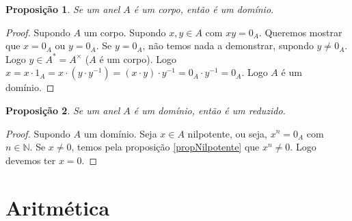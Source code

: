 \documentclass{article}
\theoremstyle{plain}
\newtheorem{prop}{Proposição}[section]
\theoremstyle{definition}
\theoremstyle{remark}
\begin{document}
\begin{prop}
	Se um anel $A$ é um corpo, então é um domínio.
\end{prop}
\begin{proof}
	Supondo $A$ um corpo. Supondo $x,y\in A$ com $xy = 0_A$. Queremos mostrar que $x =0_A$ ou $y = 0_A$. Se $y = 0_A$, não temos nada a demonstrar, supondo $y\neq 0_A$. Logo $y \in A^{*} = A^{\times}$ ($A$ é um corpo). Logo $x =x\cdot 1_A =  x\cdot (y\cdot y^{-1}) = (x\cdot y)\cdot y^{-1} = 0_A\cdot y^{-1} = 0_A$. Logo $A$ é um domínio.
\end{proof}
\begin{prop}
	Se um anel $A$ é um domínio, então é um reduzido.
\end{prop}
\begin{proof}
	Supondo $A$ um domínio. Seja $x\in A$ nilpotente, ou seja, $x^n = 0_A$ com $n\in \mathbb{N}$. Se $x\neq 0$, temos pela proposição \ref{propNilpotente} que $x^n \neq 0$.  Logo devemos ter $x = 0$.
\end{proof}
\section{Aritmética}
\end{document}
